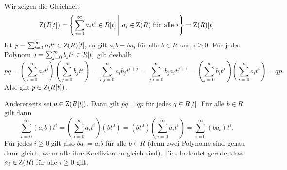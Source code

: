 \subsection{}

Wir zeigen die Gleichheit
\[
    \operatorname{Z}( R[t] )
  = \left\{
      \sum_{i=0}^\infty a_i t^i \in R[t]
    \;\middle|\;
      \text{$a_i \in \operatorname{Z}(R)$ für alle $i$}
    \right\}
  = \operatorname{Z}(R) [t]
\]
Ist $p = \sum_{i=0}^\infty a_i t^i \in \operatorname{Z}(R) [t]$, so gilt $a_i b = b a_i$ für alle $b \in R$ und $i \geq 0$.
Für jedes Polynom $q = \sum_{j=0}^\infty b_j t^j \in R[t]$ gilt deshalb
\[
     p q 
   = \left( \sum_{i=0}^\infty a_i t^i \right) \left( \sum_{j=0}^\infty b_j t^j \right)
   = \sum_{i,j=0}^\infty a_i b_j t^{i+j}
   = \sum_{j,i=0}^\infty b_j a_i t^{j+i}
   = \left( \sum_{j=0}^\infty b_j t^j \right) \left( \sum_{i=0}^\infty a_i t^i \right)
   = q p.
\]
Also gilt $p \in \operatorname{Z}( R[t] )$.

Andererseits sei $p \in \operatorname{Z}( R[t] )$.
Dann gilt $p q = q p$ für jedes $q \in R[t]$.
Für alle $b \in R$ gilt dann
\[
    \sum_{i=0}^\infty (a_i b) t^i
  = \left( \sum_{i=0}^\infty a_i t^i \right) \left( b t^0 \right)
  = \left( b t^0 \right) \left( \sum_{i=0}^\infty a_i t^i \right)
  = \sum_{i=0}^\infty (b a_i) t^i.
\]
Für jedes $i \geq 0$ gilt also $b a_i = a_i b$ für alle $b \in R$ (denn zwei Polynome sind genau dann gleich, wenn alle ihre Koeffizienten gleich sind).
Dies bedeutet gerade, dass $a_i \in \operatorname{Z}(R)$ für alle $i \geq 0$ gilt.
